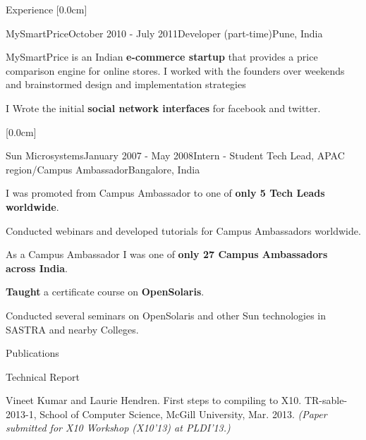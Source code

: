 \documentclass{resume} %
\begin{document}
\begin{rSection}{Experience}
[0.0cm]
\begin{rSubsection}{MySmartPrice}{October 2010 - July 2011}{Developer (part-time)}{Pune, India}
\item MySmartPrice is an Indian \textbf{e-commerce startup} that provides a price comparison engine for online stores. 
I worked with the founders over weekends and brainstormed design and implementation strategies
\item I Wrote the initial \textbf{social network interfaces} for facebook and twitter. 
\end{rSubsection}

[0.0cm]
\begin{rSubsection}{Sun Microsystems}{January 2007 - May 2008}{Intern - Student Tech Lead, APAC region/Campus Ambassador}{Bangalore, India}
\item I was promoted from Campus Ambassador to one of \textbf{only 5 Tech Leads worldwide}.
\item Conducted webinars and developed tutorials for Campus Ambassadors worldwide.
\item As a Campus Ambassador I was one of \textbf{only 27 Campus Ambassadors across India}.
\item \textbf{Taught} a certificate course on \textbf{OpenSolaris}.
\item Conducted several seminars on OpenSolaris and other Sun technologies in SASTRA and nearby Colleges.
\end{rSubsection}
\end{rSection}


\begin{rSection}{Publications}
\begin{rSubsection}{Technical Report}{}{}{}
\item Vineet Kumar and Laurie Hendren. First steps to compiling \matlab to \textsc{X10}.
TR-sable-2013-1, School of Computer Science, McGill University, Mar. 2013.
\em{(Paper submitted for X10 Workshop (X10'13) at PLDI'13.)}
\end{rSubsection}
\end{rSection}
\end{document}
